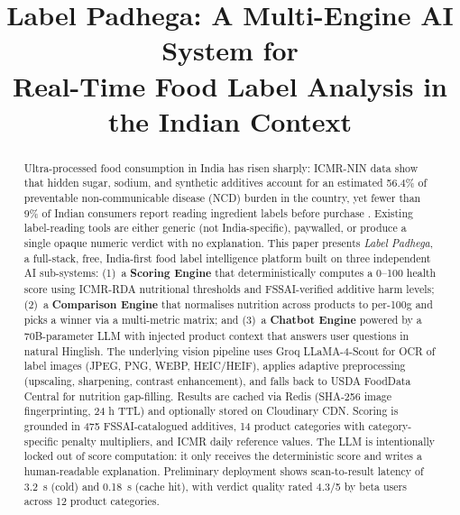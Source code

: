 \documentclass[conference]{IEEEtran}
\begin{document}
\title{Label Padhega: A Multi-Engine AI System for\\Real-Time Food Label Analysis in the Indian Context}

\author{
}

\maketitle

\begin{abstract}
Ultra-processed food consumption in India has risen sharply: ICMR-NIN data show that
hidden sugar, sodium, and synthetic additives account for an estimated 56.4\% of
preventable non-communicable disease (NCD) burden in the country, yet fewer than
9\% of Indian consumers report reading ingredient labels before purchase \cite{fssai_survey}.
Existing label-reading tools are either generic (not India-specific), paywalled,
or produce a single opaque numeric verdict with no explanation.
This paper presents \textit{Label Padhega}, a full-stack, free, India-first food
label intelligence platform built on three independent AI sub-systems:
(1)~a \textbf{Scoring Engine} that deterministically computes a 0--100 health score
using ICMR-RDA nutritional thresholds and FSSAI-verified additive harm levels;
(2)~a \textbf{Comparison Engine} that normalises nutrition across products to per-100g
and picks a winner via a multi-metric matrix; and
(3)~a \textbf{Chatbot Engine} powered by a 70B-parameter LLM with injected product
context that answers user questions in natural Hinglish.
The underlying vision pipeline uses Groq LLaMA-4-Scout for OCR of label images
(JPEG, PNG, WEBP, HEIC/HEIF), applies adaptive preprocessing (upscaling, sharpening,
contrast enhancement), and falls back to USDA FoodData Central for nutrition gap-filling.
Results are cached via Redis (SHA-256 image fingerprinting, 24 h TTL) and optionally
stored on Cloudinary CDN. Scoring is grounded in 475 FSSAI-catalogued additives,
14 product categories with category-specific penalty multipliers, and ICMR daily
reference values. The LLM is intentionally locked out of score computation: it only
receives the deterministic score and writes a human-readable explanation.
Preliminary deployment shows scan-to-result latency of 3.2~s (cold) and
0.18~s (cache hit), with verdict quality rated 4.3/5 by beta users across 12 product categories.
\end{abstract}
\end{document}
